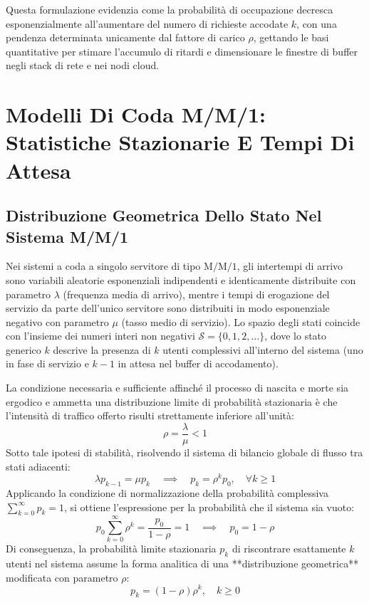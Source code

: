 \documentclass[11pt, a4paper]{article}
\begin{document}
Questa formulazione evidenzia come la probabilità di occupazione decresca esponenzialmente all'aumentare del numero di richieste accodate $k$, con una pendenza determinata unicamente dal fattore di carico $\rho$, gettando le basi quantitative per stimare l'accumulo di ritardi e dimensionare le finestre di buffer negli stack di rete e nei nodi cloud.




\section{Modelli Di Coda M/M/1: Statistiche Stazionarie E Tempi Di Attesa}

\subsection{Distribuzione Geometrica Dello Stato Nel Sistema M/M/1}

Nei sistemi a coda a singolo servitore di tipo $\mathrm{M/M/1}$, gli intertempi di arrivo sono variabili aleatorie esponenziali indipendenti e identicamente distribuite con parametro $\lambda$ (frequenza media di arrivo), mentre i tempi di erogazione del servizio da parte dell'unico servitore sono distribuiti in modo esponenziale negativo con parametro $\mu$ (tasso medio di servizio). Lo spazio degli stati coincide con l'insieme dei numeri interi non negativi $\mathcal{S} = \{0, 1, 2, \dots\}$, dove lo stato generico $k$ descrive la presenza di $k$ utenti complessivi all'interno del sistema (uno in fase di servizio e $k-1$ in attesa nel buffer di accodamento).

La condizione necessaria e sufficiente affinché il processo di nascita e morte sia ergodico e ammetta una distribuzione limite di probabilità stazionaria è che l'intensità di traffico offerto risulti strettamente inferiore all'unità:
\[
\rho = \frac{\lambda}{\mu} < 1
\]
Sotto tale ipotesi di stabilità, risolvendo il sistema di bilancio globale di flusso tra stati adiacenti:
\[
\lambda p_{k-1} = \mu p_k \quad \implies \quad p_k = \rho^k p_0, \quad \forall k \ge 1
\]
Applicando la condizione di normalizzazione della probabilità complessiva $\sum_{k=0}^{\infty} p_k = 1$, si ottiene l'espressione per la probabilità che il sistema sia vuoto:
\[
p_0 \sum_{k=0}^{\infty} \rho^k = \frac{p_0}{1-\rho} = 1 \quad \implies \quad p_0 = 1 - \rho
\]
Di conseguenza, la probabilità limite stazionaria $p_k$ di riscontrare esattamente $k$ utenti nel sistema assume la forma analitica di una **distribuzione geometrica** modificata con parametro $\rho$:
\[
\boxed{p_k = (1 - \rho)\rho^k, \quad k \ge 0}
\]
\end{document}
